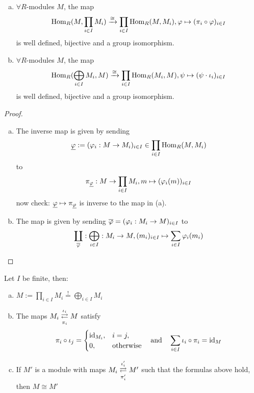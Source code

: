 \documentclass[a4paper]{report}
\begin{document}
\begin{thm}
\begin{enumerate}[(a)]
        \item $\forall R$-modules $M$, the map
        \[\operatorname{Hom}_{R}(M, \prod_{i \in I}M_{i}) \xrightarrow{\cong} \prod_{i \in I} \operatorname{Hom}_{R}(M, M_{i}), \varphi \mapsto (\pi_{i} \circ \varphi)_{i \in I}\]is well defined, bijective and a group isomorphism.
        \item $\forall R$-modules $M$, the map
        \[\operatorname{Hom}_{R}(\bigoplus_{i \in I}M_{i}, M) \xrightarrow{\cong} \prod_{i \in I} \operatorname{Hom}_{R}(M_{i}, M), \psi \mapsto (\psi \cdot \iota_{i})_{i \in I}\]is well defined, bijective and a group isomorphism.
\end{enumerate}
\begin{proof}
  \begin{enumerate}[(a)]
    \item The inverse map is given by sending \[\underline {\varphi}:= (\varphi_{i}: M \to M_{i})_{i \in I} \in \prod_{i \in I}\operatorname{Hom}_{R}(M, M_{i})\]
          to \[\pi_{\underline {\varphi}} : M \to \prod_{i \in I}M_{i}, m \mapsto (\varphi_{i}(m))_{i \in I}\]
          now check: $\underline {\varphi} \mapsto \pi_{\underline {\varphi}}$ is inverse to the map in (a).
    \item The map is given by sending $\overline {\varphi} = (\varphi_{i} : M _{i} \to M)_{i \in I}$ to
          \[\coprod_{\overline {\varphi}} : \bigoplus_{i \in I}: M_{i} \to M, (m_{i})_{i \in I} \mapsto \sum_{i \in I} \varphi_{i}(m_{i})\]
  \end{enumerate}
\end{proof}
\end{thm}

\begin{cor}
  Let $I$ be finite, then:
  \begin{enumerate}[(a)]
    \item $M := \prod_{i \in I} M_{i} \overset != \bigoplus_{i \in I}M_{i}$
    \item The maps $M_{i} \overunderset {\iota_{i}}{\pi_{i}}\rightleftarrows M$ satisfy \[\pi_{i} \circ \iota_{j} = \begin{cases} \operatorname{id}_{M_{i}},& i = j, \\ 0, &\text{otherwise}\end{cases}\quad \text{and}\quad \sum_{i \in I}\iota_{i} \circ \pi_{i} = \operatorname{id}_{M}\]
          \item If $M'$ is a module with maps $M_{i} \overunderset {\iota_{i}'}{\pi_{i}'}\rightleftarrows M'$ such that the formulas above hold, then $M \cong M'$
  \end{enumerate}
\end{cor}
\end{document}
